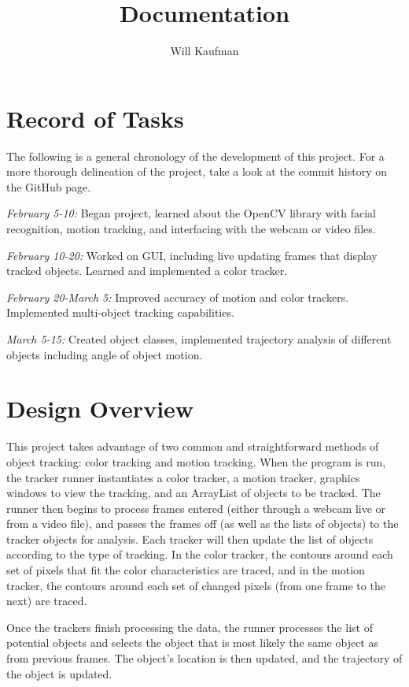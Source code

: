\documentclass[11pt]{article}
\begin{document}
\title{Documentation}
\author{Will Kaufman}
\maketitle

\section{Record of Tasks}
The following is a general chronology of the development of this project.  For a more thorough delineation of the project, take a look at the commit history on the GitHub page.

\emph{February 5-10:} Began project, learned about the OpenCV library with facial recognition, motion tracking, and interfacing with the webcam or video files.

\emph{February 10-20:} Worked on GUI, including live updating frames that display tracked objects.  Learned and implemented a color tracker.

\emph{February 20-March 5:} Improved accuracy of motion and color trackers.  Implemented multi-object tracking capabilities.

\emph{March 5-15:} Created object classes, implemented trajectory analysis of different objects including angle of object motion.

\section{Design Overview}
This project takes advantage of two common and straightforward methods of object tracking: color tracking and motion tracking.  When the program is run, the tracker runner instantiates a color tracker, a motion tracker, graphics windows to view the tracking, and an ArrayList of objects to be tracked.  The runner then begins to process frames entered (either through a webcam live or from a video file), and passes the frames off (as well as the lists of objects) to the tracker objects for analysis.  Each tracker will then update the list of objects according to the type of tracking.  In the color tracker, the contours around each set of pixels that fit the color characteristics are traced, and in the motion tracker, the contours around each set of changed pixels (from one frame to the next) are traced.

Once the trackers finish processing the data, the runner processes the list of potential objects and selects the object that is most likely the same object as from previous frames.  The object's location is then updated, and the trajectory of the object is updated.
\end{document}
